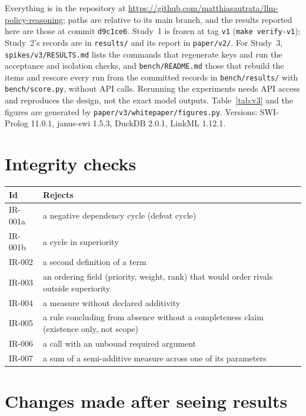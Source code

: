 \documentclass[11pt]{article}
\newcommand{\repo}[1]{\texttt{#1}}
\begin{document}
Everything is in the repository at \url{https://github.com/matthiasautrata/llm-policy-reasoning}; paths are
relative to its main branch, and the results reported here are those at commit \texttt{d9c1ce6}. Study~1 is frozen at
tag \repo{v1} (\repo{make verify-v1}); Study~2's records are in \repo{results/} and its report in \repo{paper/v2/}.
For Study~3, \repo{spikes/v3/RESULTS.md} lists the commands that regenerate keys and run the acceptance and isolation
checks, and \repo{bench/README.md} those that rebuild the items and rescore every run from the committed records in
\repo{bench/results/} with \repo{bench/score.py}, without API calls. Rerunning the experiments needs API access and
reproduces the design, not the exact model outputs. Table~\ref{tab:v3} and the figures are generated by
\repo{paper/v3/whitepaper/figures.py}. Versions: SWI-Prolog 11.0.1, janus-swi 1.5.3, DuckDB 2.0.1, LinkML 1.12.1.

\section{Integrity checks}
\label{app:gate}

\begin{table}[h]
\centering\small
\begin{tabular}{ll}
\toprule
Id & Rejects\\
\midrule
IR-001a & a negative dependency cycle (defeat cycle)\\
IR-001b & a cycle in superiority\\
IR-002 & a second definition of a term\\
IR-003 & an ordering field (priority, weight, rank) that would order rivals outside superiority\\
IR-004 & a measure without declared additivity\\
IR-005 & a rule concluding from absence without a completeness claim (existence only, not scope)\\
IR-006 & a call with an unbound required argument\\
IR-007 & a sum of a semi-additive measure across one of its parameters\\
\bottomrule
\end{tabular}
\end{table}

\section{Changes made after seeing results}
\label{app:changes}
\end{document}
